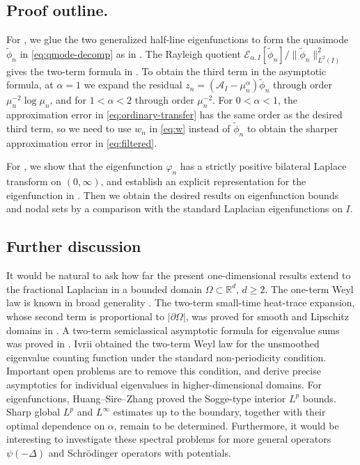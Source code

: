 \documentclass[11pt]{amsart}
\numberwithin{equation}{section}
\theoremstyle{remark}
\newcommand{\wt}{\widetilde}
\newcommand{\calE}{\mathcal E}
\begin{document}
\subsection{Proof outline.}
For , we glue the two generalized half-line eigenfunctions to form the quasimode $\wt\phi_n$ in \eqref{eq:qmode-decomp} as in  \cite{KulczyckiKwasnickiMaleckiStos,KwasnickiInterval,KaletaKwasnickiMalecki}.  The Rayleigh quotient
$\calE_{\alpha,I}[\wt\phi_n]/\|\wt\phi_n\|_{L^2(I)}^2$ gives the
two-term formula in .  To obtain the third term in the asymptotic formula, at $\alpha=1$ we expand the residual
$z_n=(\mathcal A_I-\mu_n^\alpha)\wt\phi_n$ through order
$\mu_n^{-2}\log\mu_n$, and for $1<\alpha<2$ through order
$\mu_n^{-2}$.  For $0<\alpha<1$, the approximation error in
\eqref{eq:ordinary-transfer} has the same order as the desired third term, so
we need to use $w_n$ in \eqref{eq:w} instead of $\wt\phi_n$ to obtain the sharper approximation error in
\eqref{eq:filtered}.

For , we show that the eigenfunction $\varphi_n$ has a strictly positive bilateral Laplace transform on $(0,\infty)$, and  establish an explicit representation for the eigenfunction  in . Then we obtain the desired results on  eigenfunction bounds and nodal sets by a comparison with  the standard Laplacian eigenfunctions on $I$.

\subsection{Further discussion}
It would be natural to ask how far the present one-dimensional results extend
to the fractional Laplacian in a bounded domain
$\Omega\subset\mathbb R^d$, $d\ge2$.  The  one-term Weyl law is known in broad
generality \cite{BlumenthalGetoor,GeisingerWeyl,GrubbSpectral,GrubbWeyl}.  The two-term
small-time heat-trace expansion, whose second term is proportional to
$|\partial\Omega|$, was proved for smooth and Lipschitz domains in
\cite{BanuelosKulczycki,BanuelosKulczyckiSiudeja}.  A
two-term semiclassical asymptotic formula for eigenvalue sums was proved in \cite{FrankGeisinger}. Ivrii
\cite{IvriiFractional} obtained the two-term Weyl law for the unsmoothed
eigenvalue counting function under the standard non-periodicity condition. 
Important open problems are to remove this condition,  and derive precise asymptotics for
individual eigenvalues in higher-dimensional domains. 
For eigenfunctions, Huang--Sire--Zhang \cite{HuangSireZhang} proved the
Sogge-type interior $L^p$ bounds.  Sharp global $L^p$ and $L^\infty$ estimates
up to the boundary, together with their optimal dependence on $\alpha$, remain
to be determined. Furthermore, it would be interesting to investigate these spectral problems for more general operators $\psi(-\Delta)$ and Schr\"odinger operators with potentials.
\end{document}
